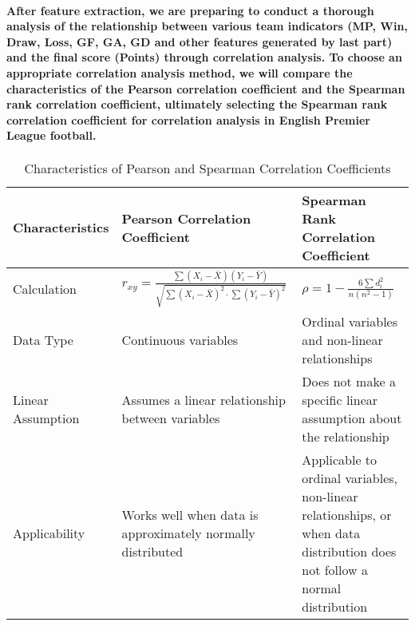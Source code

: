 \paragraph{After feature extraction, we are preparing to conduct a thorough analysis of the relationship between various team indicators (MP, Win, Draw, Loss, GF, GA, GD and other features generated by last part) and the final score (Points) through correlation analysis. To choose an appropriate correlation analysis method, we will compare the characteristics of the Pearson correlation coefficient and the Spearman rank correlation coefficient, ultimately selecting the Spearman rank correlation coefficient for correlation analysis in English Premier League football.}
% 
% 
\begin{table}[h]
    \centering
    \caption{Characteristics of Pearson and Spearman Correlation Coefficients}
    \begin{tabularx}{\textwidth}{|p{2.5cm}|X|X|}
        \hline
        Characteristics     & Pearson Correlation Coefficient                                                                                       & Spearman Rank Correlation Coefficient                                                                                      \\
        \hline
        Calculation         & $   r_{xy}=\frac{\sum{(X_i - \bar{X})(Y_i - \bar{Y})}}{\sqrt{\sum{(X_i - \bar{X})^2} \cdot \sum{(Y_i - \bar{Y})^2}}}$ & $ \rho = 1 - \frac{6\sum{d_i^2}}{n(n^2 - 1)}$                                                                              \\
        \hline
        Data Type           & Continuous variables                                                                                                  & Ordinal variables and non-linear relationships                                                                             \\
        \hline
        Linear Assumption   & Assumes a linear relationship between variables                                                                       & Does not make a specific linear assumption about the relationship                                                          \\
        \hline
        Applicability       & Works well when data is approximately normally distributed                                                            & Applicable to ordinal variables, non-linear relationships, or when data distribution does not follow a normal distribution \\

\end{tabularx}
\end{table}
